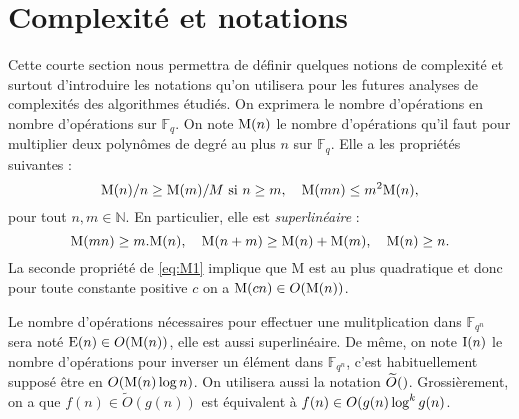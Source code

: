 \documentclass[a4paper]{article} %
\numberwithin{section}{part}
\numberwithin{equation}{section}
\newcommand\GF[1]{\mathbb{F}_{#1}}
\newcommand\NN{\mathbb{N}}
\newcommand\M[1]{\textup{M}(#1)}
\newcommand\E[1]{\textup{E}(#1)}
\newcommand\I[1]{\textup{I}(#1)}
\newcommand\tO[1]{\widetilde{O}(#1)}
\begin{document}
\section{Complexité et notations}
Cette courte section nous permettra de définir quelques notions de complexité
et surtout d'introduire les notations qu'on utilisera pour les futures analyses
de complexités des algorithmes étudiés.
On exprimera le nombre d'opérations en nombre d'opérations sur $\GF{q}$. On note
$\M{n}$ le nombre d'opérations qu'il faut pour multiplier deux polynômes
de degré au plus $n$ sur $\GF{q}$. Elle a les propriétés suivantes :
\begin{equation}
\label{eq:M1}
\M{n}/n\geq\M{m}/M\textup{ si }n\geq m,\quad \M{mn} \leq m^2\M{n},
\end{equation}
pour tout $n, m\in\NN$. En particulier, elle est \emph{superlinéaire} :
\begin{equation}
\M{mn}\geq m.\M{n},\quad \M{n + m}\geq\M{n} + \M{m}, \quad \M{n}\geq n.
\end{equation}
La seconde propriété de \ref{eq:M1} implique que M est au plus quadratique et 
donc pour toute constante positive $c$ on a $\M{cn}\in O(\M{n})$.\par
Le nombre d'opérations nécessaires pour effectuer une mulitplication dans
$\GF{q^n}$ sera noté $\E{n}\in O(\M{n})$, elle est aussi superlinéaire. De même,
on note $\I{n}$ le nombre d'opérations pour inverser un élément dans $\GF{q^n}$,
c'est habituellement supposé être en $O(\M{n}\,\textup{log\,}n)$.
On utilisera aussi la notation $\tO$. Grossièrement, on a que $f(n)\in\tO{g(n)}$
est équivalent à $f(n)\in O(g(n)\,\textup{log}^k\,g(n)$.
\end{document}
